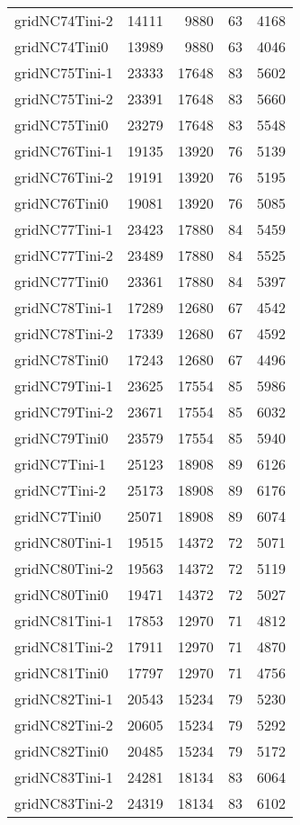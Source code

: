 \begin{longtable}{lrrrr}
gridNC74Tini-2 & 14111 & 9880 & 63 & 4168 \\
gridNC74Tini0 & 13989 & 9880 & 63 & 4046 \\
gridNC75Tini-1 & 23333 & 17648 & 83 & 5602 \\
gridNC75Tini-2 & 23391 & 17648 & 83 & 5660 \\
gridNC75Tini0 & 23279 & 17648 & 83 & 5548 \\
gridNC76Tini-1 & 19135 & 13920 & 76 & 5139 \\
gridNC76Tini-2 & 19191 & 13920 & 76 & 5195 \\
gridNC76Tini0 & 19081 & 13920 & 76 & 5085 \\
gridNC77Tini-1 & 23423 & 17880 & 84 & 5459 \\
gridNC77Tini-2 & 23489 & 17880 & 84 & 5525 \\
gridNC77Tini0 & 23361 & 17880 & 84 & 5397 \\
gridNC78Tini-1 & 17289 & 12680 & 67 & 4542 \\
gridNC78Tini-2 & 17339 & 12680 & 67 & 4592 \\
gridNC78Tini0 & 17243 & 12680 & 67 & 4496 \\
gridNC79Tini-1 & 23625 & 17554 & 85 & 5986 \\
gridNC79Tini-2 & 23671 & 17554 & 85 & 6032 \\
gridNC79Tini0 & 23579 & 17554 & 85 & 5940 \\
gridNC7Tini-1 & 25123 & 18908 & 89 & 6126 \\
gridNC7Tini-2 & 25173 & 18908 & 89 & 6176 \\
gridNC7Tini0 & 25071 & 18908 & 89 & 6074 \\
gridNC80Tini-1 & 19515 & 14372 & 72 & 5071 \\
gridNC80Tini-2 & 19563 & 14372 & 72 & 5119 \\
gridNC80Tini0 & 19471 & 14372 & 72 & 5027 \\
gridNC81Tini-1 & 17853 & 12970 & 71 & 4812 \\
gridNC81Tini-2 & 17911 & 12970 & 71 & 4870 \\
gridNC81Tini0 & 17797 & 12970 & 71 & 4756 \\
gridNC82Tini-1 & 20543 & 15234 & 79 & 5230 \\
gridNC82Tini-2 & 20605 & 15234 & 79 & 5292 \\
gridNC82Tini0 & 20485 & 15234 & 79 & 5172 \\
gridNC83Tini-1 & 24281 & 18134 & 83 & 6064 \\
gridNC83Tini-2 & 24319 & 18134 & 83 & 6102 \\

\end{longtable}
